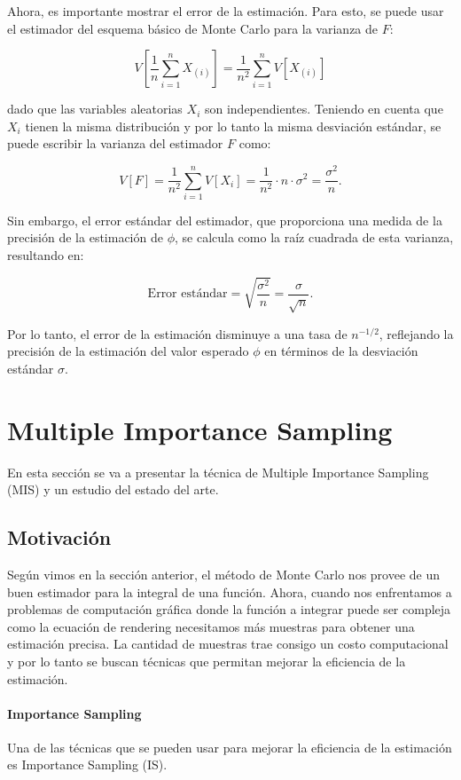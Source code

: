 \documentclass{article}
\begin{document}
Ahora, es importante mostrar el error de la estimación. Para esto, se puede usar el estimador del esquema básico de Monte Carlo para la varianza de $F$:

$$V[\frac{1}{n}\sum_{i=1}^{n} X_{(i)}] = \frac{1}{n^{2}} \sum_{i=1}^{n} V[X_{(i)}]$$

dado que las variables aleatorias $X_{i}$ son independientes. Teniendo en cuenta que $X_{i}$ tienen la misma distribución y por lo tanto la misma desviación estándar, se puede escribir la varianza del estimador $F$ como:

$$V[F] = \frac{1}{n^{2}} \sum_{i=1}^{n} V[X_{i}] = \frac{1}{n^{2}} \cdot n \cdot \sigma^{2} = \frac{\sigma^{2}}{n}.$$

Sin embargo, el error estándar del estimador, que proporciona una medida de la precisión de la estimación de $\phi$, se calcula como la raíz cuadrada de esta varianza, resultando en:

$$\text{Error estándar} = \sqrt{\frac{\sigma^{2}}{n}} = \frac{\sigma}{\sqrt{n}}.$$

Por lo tanto, el error de la estimación disminuye a una tasa de $n^{-1/2}$, reflejando la precisión de la estimación del valor esperado $\phi$ en términos de la desviación estándar $\sigma$.

\section{Multiple Importance Sampling}

En esta sección se va a presentar la técnica de Multiple Importance Sampling (MIS) y un estudio del estado del arte.

\subsection{Motivación}

Según vimos en la sección anterior, el método de Monte Carlo nos provee de un buen estimador para la integral de una función.
Ahora, cuando nos enfrentamos a problemas de computación gráfica donde la función a integrar puede ser compleja como la ecuación de rendering necesitamos más muestras para obtener una estimación precisa.
La cantidad de muestras trae consigo un costo computacional y por lo tanto se buscan técnicas que permitan mejorar la eficiencia de la estimación.

\paragraph{Importance Sampling}
Una de las técnicas que se pueden usar para mejorar la eficiencia de la estimación es Importance Sampling (IS).
\end{document}
